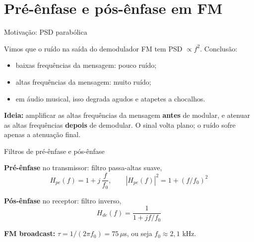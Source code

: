 
\section{Pré-ênfase e pós-ênfase em FM}

\begin{frame}{Motivação: PSD parabólica}

Vimos que o ruído na saída do demodulador FM tem PSD $\propto f^2$. Conclusão:

\vspace{0.3cm}

\begin{itemize}
\item baixas frequências da mensagem: pouco ruído;
\item altas frequências da mensagem: muito ruído;
\item em áudio musical, isso degrada agudos e atapetes a chocalhos.
\end{itemize}

\vspace{0.3cm}

\textbf{Ideia:} amplificar as altas frequências da mensagem \textbf{antes} de modular, e atenuar as altas frequências \textbf{depois} de demodular. O sinal volta plano; o ruído sofre apenas a atenuação final.

\end{frame}


\begin{frame}{Filtros de pré-ênfase e pós-ênfase}

\textbf{Pré-ênfase} no transmissor: filtro passa-altas suave,
\[
H_{pe}(f) = 1 + j\, \frac{f}{f_0}, \qquad |H_{pe}(f)|^2 = 1 + (f/f_0)^2
\]

\textbf{Pós-ênfase} no receptor: filtro inverso,
\[
H_{de}(f) = \frac{1}{1 + j f/f_0}
\]

\textbf{FM broadcast:} $\tau = 1/(2\pi f_0) = 75\,\mu$s, ou seja $f_0 \approx 2{,}1$ kHz.

\end{frame}



